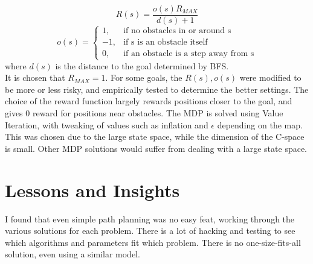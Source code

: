 \[R(s) = \frac{o(s)R_{MAX}}{d(s) + 1}\]
\[o(s) =
    \begin{cases}
        1, & \text{if no obstacles in or around s}\\
        -1, & \text{if s is an obstacle itself}\\
        0, & \text{if an obstacle is a step away from s}
    \end{cases}
\]
where $d(s)$ is the distance to the goal determined by BFS.\\
It is chosen that $R_{MAX}=1$. 
For some goals, the $R(s), o(s)$ were modified to be
more or less risky, and empirically tested to determine the better settings.
The choice of the reward function largely rewards positions 
closer to the goal, and gives 0 reward for positions near obstacles.
The MDP is solved using Value Iteration, with tweaking of values such
as inflation and $\epsilon$ depending on the map.
This was chosen due to the large state space, while the dimension
of the C-space is small. Other MDP solutions would suffer from
dealing with a large state space.

\section{Lessons and Insights}

I found that even simple path planning was no easy feat, working through
the various solutions for each problem. There is a lot of hacking and
testing to see which algorithms and parameters fit which problem.
There is no one-size-fits-all solution, even using a similar model.

